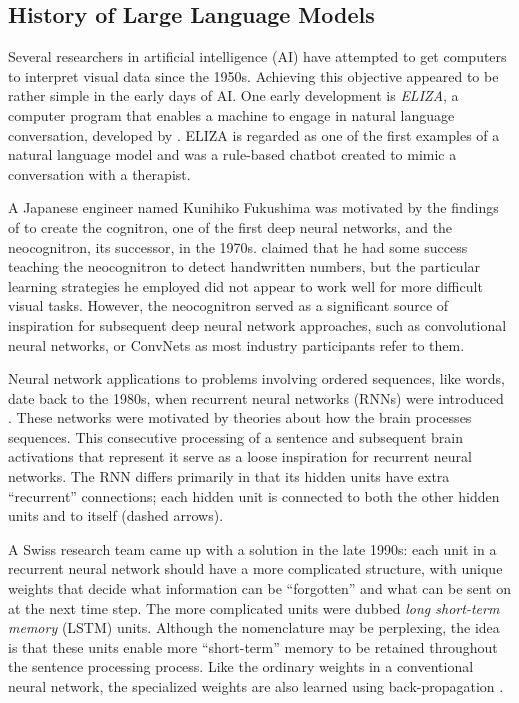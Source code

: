 \subsection{History of Large Language Models}

Several researchers in artificial intelligence (AI) have attempted to get computers to interpret visual data since the 1950s. Achieving this objective appeared to be rather simple in the early days of AI. One early development is \textit{ELIZA}, a computer program that enables a machine to engage in natural language conversation, developed by \cite{weizenbaum1966}. ELIZA is regarded as one of the first examples of a natural language model and was a rule-based chatbot created to mimic a conversation with a therapist.

A Japanese engineer named Kunihiko Fukushima was motivated by the findings of \cite{hubel1959} to create the cognitron, one of the first deep neural networks, and the neocognitron, its successor, in the 1970s. \cite{fukushima1969} claimed that he had some success teaching the neocognitron to detect handwritten numbers, but the particular learning strategies he employed did not appear to work well for more difficult visual tasks. However, the neocognitron served as a significant source of inspiration for subsequent deep neural network approaches, such as convolutional neural networks, or ConvNets as most industry participants refer to them.

Neural network applications to problems involving ordered sequences, like words, date back to the 1980s, when recurrent neural networks (RNNs) were introduced \cite{elman1990}. These networks were motivated by theories about how the brain processes sequences. This consecutive processing of a sentence and subsequent brain activations that represent it serve as a loose inspiration for recurrent neural networks. The RNN differs primarily in that its hidden units have extra ``recurrent'' connections; each hidden unit is connected to both the other hidden units and to itself (dashed arrows).

A Swiss research team came up with a solution in the late 1990s: each unit in a recurrent neural network should have a more complicated structure, with unique weights that decide what information can be ``forgotten'' and what can be sent on at the next time step. The more complicated units were dubbed \textit{long short-term memory} (LSTM) units. Although the nomenclature may be perplexing, the idea is that these units enable more ``short-term'' memory to be retained throughout the sentence processing process. Like the ordinary weights in a conventional neural network, the specialized weights are also learned using back-propagation \cite{gers2000}.


